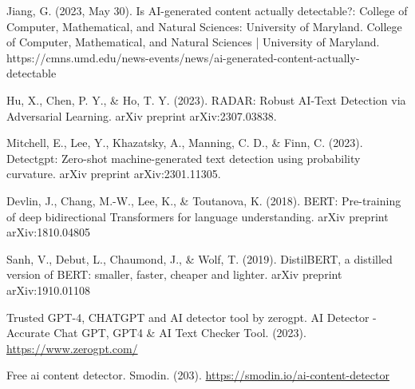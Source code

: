 \documentclass{article}
\begin{document}


Jiang, G. (2023, May 30). Is AI-generated content actually detectable?: College of Computer, Mathematical, and Natural Sciences: University of Maryland. College of Computer, Mathematical, and Natural Sciences | University of Maryland. https://cmns.umd.edu/news-events/news/ai-generated-content-actually-detectable 

Hu, X., Chen, P. Y., \& Ho, T. Y. (2023). RADAR: Robust AI-Text Detection via Adversarial Learning. arXiv preprint arXiv:2307.03838.

Mitchell, E., Lee, Y., Khazatsky, A., Manning, C. D., \& Finn, C. (2023). Detectgpt: Zero-shot machine-generated text detection using probability curvature. arXiv preprint arXiv:2301.11305.

Devlin, J., Chang, M.-W., Lee, K., \& Toutanova, K. (2018). BERT: Pre-training of deep bidirectional Transformers for language understanding. arXiv preprint arXiv:1810.04805

Sanh, V., Debut, L., Chaumond, J., \& Wolf, T. (2019). DistilBERT, a distilled version of BERT: smaller, faster, cheaper and lighter. arXiv preprint arXiv:1910.01108

Trusted GPT-4, CHATGPT and AI detector tool by zerogpt. AI Detector - Accurate Chat GPT, GPT4 \& AI Text Checker Tool. (2023). \url{https://www.zerogpt.com/}

Free ai content detector. Smodin. (203). \url{https://smodin.io/ai-content-detector}
\end{document}
